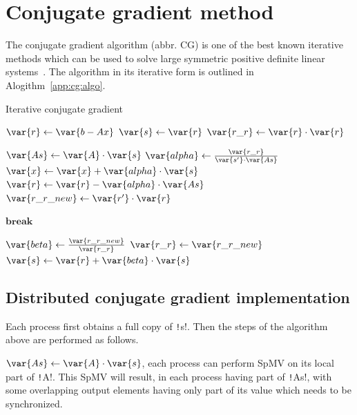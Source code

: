 \documentclass[thesis=M,english]{FITthesis}[2019/12/23]
\newcommand{\csre}[1]{\texttt!#1!}
\begin{document}
\chapter{Conjugate gradient method}\label{app:cg}

The conjugate gradient algorithm (abbr. CG) is one of the best known iterative methods which can be used to solve large
symmetric positive definite linear systems~\cite{saad03:IMS}. The algorithm in its iterative form is outlined
in Alogithm~\ref{app:cg:algo}.

\begin{algorithm}
    \caption{Iterative conjugate gradient}\label{app:cg:algo}
    \begin{algorithmic}
        \State $\var{r} \gets \var{b - Ax}$
        \State $\var{s} \gets \var{r}$
        \State $\var{r\_r} \gets \var{r} \cdot \var{r}$

        \State $\var{As} \gets \var{A} \cdot \var{s}$
        \State $\var{alpha} \gets \frac{\var{r\_r}}{\var{s'} \cdot \var{As}} $
        \State $\var{x} \gets \var{x} + \var{alpha} \cdot \var{s}$
        \State $\var{r} \gets \var{r} - \var{alpha} \cdot \var{As}$
        \State $\var{r\_r\_new} \gets \var{r'} \cdot \var{r}$

        \State $\textbf{break}$
        \EndIf

        \State $\var{beta} \gets \frac{\var{r\_r\_new}}{\var{r\_r}}$
        \State $\var{r\_r} \gets \var{r\_r\_new}$
        \State $\var{s} \gets \var{r} + \var{beta} \cdot \var{s}$

        \EndFor

        \EndFunction
    \end{algorithmic}
\end{algorithm}

\section{Distributed conjugate gradient implementation}

Each process first obtains a full copy of \csre{s}.
Then the steps of the algorithm above are performed as follows.

$\var{As} \gets \var{A} \cdot \var{s}$, each process can perform SpMV on its local part of
\csre{A}. This SpMV will result, in each process having part of \csre{As}, with some overlapping
output elements having only part of its value which needs to be synchronized.
\end{document}
